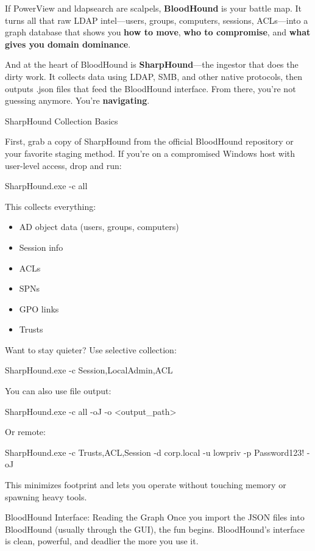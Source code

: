 If PowerView and ldapsearch are scalpels, \textbf{BloodHound} is your battle map. It turns all that raw LDAP intel—users, groups, computers, sessions, ACLs—into a graph database that shows you \textbf{how to move}, \textbf{who to compromise}, and \textbf{what gives you domain dominance}.

And at the heart of BloodHound is \textbf{SharpHound}—the ingestor that does the dirty work. It collects data using LDAP, SMB, and other native protocols, then outputs .json files that feed the BloodHound interface. From there, you’re not guessing anymore. You’re \textbf{navigating}.

SharpHound Collection Basics

First, grab a copy of SharpHound from the official BloodHound repository or your favorite staging method. If you’re on a compromised Windows host with user-level access, drop and run:

SharpHound.exe -c all

This collects everything:

\begin{itemize}
    \item AD object data (users, groups, computers)

    \item Session info

    \item ACLs

    \item SPNs

    \item GPO links

    \item Trusts

\end{itemize}
Want to stay quieter? Use selective collection:

SharpHound.exe -c Session,LocalAdmin,ACL

You can also use file output:

SharpHound.exe -c all -oJ -o <output\_path>

Or remote:

SharpHound.exe -c Trusts,ACL,Session -d corp.local -u lowpriv -p Password123! -oJ

This minimizes footprint and lets you operate without touching memory or spawning heavy tools.

BloodHound Interface: Reading the Graph
Once you import the JSON files into BloodHound (usually through the GUI), the fun begins. BloodHound’s interface is clean, powerful, and deadlier the more you use it.

